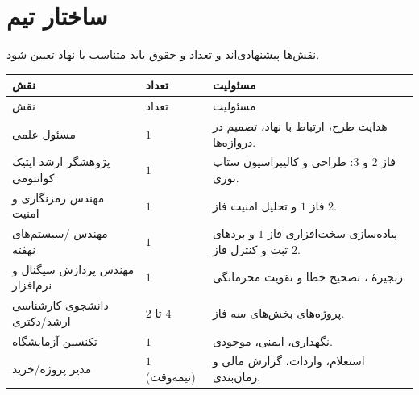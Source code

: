 \section{ساختار تیم}
\label{sec:team}
نقش‌ها پیشنهادی‌اند و تعداد و حقوق باید متناسب با نهاد تعیین شود.
\begin{longtable}{R{4.36cm}C{1.75cm}R{8.92cm}}
\toprule {} نقش & تعداد & مسئولیت \\ \midrule
\endfirsthead
\toprule {} نقش & تعداد & مسئولیت \\ \midrule
\endhead
مسئول علمی & $1$ & هدایت طرح، ارتباط با نهاد، تصمیم در دروازه‌ها. \\
پژوهشگر ارشد اپتیک کوانتومی & $1$ & فاز $2$ و $3$: طراحی و کالیبراسیون ستاپ نوری. \\
مهندس رمزنگاری و امنیت & $1$ & فاز $1$ و تحلیل امنیت فاز $2$. \\
مهندس /سیستم‌های نهفته & $1$ & پیاده‌سازی سخت‌افزاری فاز $1$ و بردهای ثبت و کنترل فاز $2$. \\
مهندس پردازش سیگنال و نرم‌افزار & $1$ & زنجیرهٔ ، تصحیح خطا و تقویت محرمانگی. \\
دانشجوی کارشناسی ارشد/دکتری & $2$ تا $4$ & پروژه‌های بخش‌های سه فاز. \\
تکنسین آزمایشگاه & $1$ & نگهداری، ایمنی، موجودی. \\
مدیر پروژه/خرید & $1$ (نیمه‌وقت) & استعلام، واردات، گزارش مالی و زمان‌بندی. \\
\bottomrule\end{longtable}

